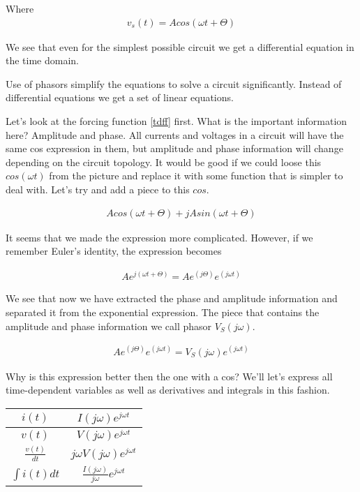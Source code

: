 Where
\begin{eqnarray}
v_s(t)= A cos (\omega t + \Theta ) \label{tdff}
\end{eqnarray}

We see that even for the simplest possible circuit we get a
differential equation in the time domain.

Use of phasors simplify the equations to solve a circuit
significantly. Instead of differential equations we get a set of
linear equations. 
 
Let's look at the forcing function \ref{tdff} first. What is the
important information here? Amplitude and phase. All currents and
voltages in a circuit will have the same cos expression in them, but amplitude and
phase information will change depending on the circuit topology. It would be good if we
could loose this $cos (\omega t)$ from the picture and replace it with some
function that is simpler to deal with.  Let's try and add a piece to
this $cos$. 

\begin{eqnarray}
 A cos (\omega t + \Theta ) + j A sin (\omega t + \Theta)
\end{eqnarray}

It seems that we made the expression more complicated. However, if we
remember Euler's identity, the expression becomes


\begin{eqnarray}
A e^{j(\omega t + \Theta)}=A e^(j\Theta) e^(j\omega t)
\end{eqnarray}

We see that now we have extracted the phase and amplitude information
and separated it from the exponential expression. The piece that
contains the amplitude and phase information we call phasor $V_S(j \omega)$.



\begin{eqnarray}
A e^(j\Theta) e^(j\omega t)=V_S(j \omega) e^(j\omega t)
\end{eqnarray}


Why is this expression better then the one with a cos? We'll let's
express all time-dependent variables as well as derivatives and
integrals in this fashion. 




\begin{center}
\begin{tabular}{|c|c|} \hline
$ i(t)$ & $I(j \omega)   e^{j\omega t}$    \\  \hline       
$ v(t)$ & $V(j \omega)   e^{j\omega t}$ \\ \hline
$ \frac{v(t)}{dt}$ & $j \omega V(j \omega)   e^{j\omega t}$ \\ \hline
$ \int  i(t) dt$ & $\frac{I(j \omega)}{j \omega}   e^{j\omega t}$ \\ \hline
\end{tabular}
\end{center}


